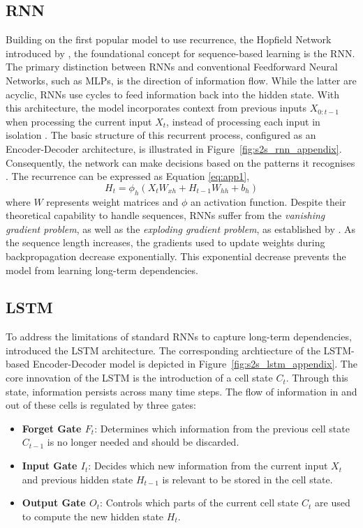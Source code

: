 \subsection*{\acf{RNN}}
Building on the first popular model to use recurrence, the Hopfield Network introduced by \textcite{hopfieldrnn}, the foundational concept for sequence-based learning is the \ac{RNN}. 
The primary distinction between \acp{RNN} and conventional Feedforward Neural Networks, such as \acp{MLP}, is the direction of information flow. 
While the latter are acyclic, \acp{RNN} use cycles to feed information back into the hidden state. 
With this architecture, the model incorporates context from previous inputs $X_{0:t-1}$ when processing the current input $X_t$, instead of processing each input in isolation \parencite{gentleschmidt2019recurrentneuralnetworksrnns}.
The basic structure of this recurrent process, configured as an Encoder-Decoder architecture, is illustrated in Figure~\ref{fig:s2s_rnn_appendix}.
Consequently, the network can make decisions based on the patterns it recognises \parencite{AIBook}. 
The recurrence can be expressed as Equation \ref{eq:app1},
\begin{equation}
    H_t = \phi_h (X_t W_{xh} + H_{t-1} W_{hh} + b_h) 
    \label{eq:app1}
\end{equation}
where $W$ represents weight matrices and $\phi$ an activation function. 
Despite their theoretical capability to handle sequences, \acp{RNN} suffer from the \emph{vanishing gradient problem}, as well as the \emph{exploding gradient problem}, as established by \textcite{279181bengio}.
As the sequence length increases, the gradients used to update weights during backpropagation decrease exponentially. 
This exponential decrease prevents the model from learning long-term dependencies.

\subsection*{\acf{LSTM}}
To address the limitations of standard \acp{RNN} to capture long-term dependencies, \textcite{hochreiterLSTM} introduced the \ac{LSTM} architecture. 
The corresponding archtiecture of the \ac{LSTM}-based Encoder-Decoder model is depicted in Figure~\ref{fig:s2s_lstm_appendix}.
The core innovation of the \ac{LSTM} is the introduction of a cell state $C_t$. 
Through this state, information persists across many time steps. 
The flow of information in and out of these cells is regulated by three gates:
\begin{itemize}
    \item \textbf{Forget Gate $F_t$}: Determines which information from the previous cell state $C_{t-1}$ is no longer needed and should be discarded.
    \item \textbf{Input Gate $I_t$}: Decides which new information from the current input $X_t$ and previous hidden state $H_{t-1}$ is relevant to be stored in the cell state.
    \item \textbf{Output Gate $O_t$}: Controls which parts of the current cell state $C_t$ are used to compute the new hidden state $H_t$.
\end{itemize}

